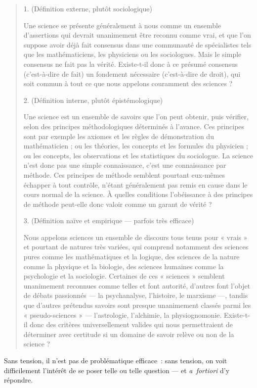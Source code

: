 \documentclass[a4paper,11pt]{article}
\begin{document}
\begin{quote}
  1. (Définition externe, plutôt sociologique)

Une science se présente généralement à nous comme un ensemble
d'assertions qui devrait unanimement être reconnu comme vrai, et que
l'on suppose avoir déjà fait consensus dans une communauté de
spécialistes tels que les mathématiciens, les physiciens ou les
sociologues. Mais le simple consensus ne fait pas la vérité. Existe-t-il
donc à ce présumé consensus (c'est-à-dire de fait) un fondement
nécessaire (c'est-à-dire de droit), qui soit commun à tout ce que nous
appelons couramment des sciences ?


2. (Définition interne, plutôt épistémologique)

Une science est un ensemble de savoirs que l'on peut obtenir, puis
vérifier, selon des principes méthodologiques déterminés à l'avance. Ces
principes sont par exemple les axiomes et les règles de démonstration du
mathématicien ; ou les théories, les concepts et les formules du
physicien ; ou les concepts, les observations et les statistiques du
sociologue. La science n'est donc pas une simple connaissance, c'est une
connaissance par méthode. Ces principes de méthode semblent pourtant
eux-mêmes échapper à tout contrôle, n'étant généralement pas remis en
cause dans le cours normal de la science. À quelles conditions
l'obéissance à des principes de méthode peut-elle donc valoir comme un
garant de vérité ?


3. (Définition naïve et empirique — parfois très efficace)

Nous appelons sciences un ensemble de discours tous tenus pour « vrais »
et pourtant de natures très variées, qui comprend notamment des sciences
pures comme les mathématiques et la logique, des sciences de la nature
comme la physique et la biologie, des sciences humaines comme la
psychologie et la sociologie. Certaines de ces « sciences » semblent
unanimement reconnues comme telles et font autorité, d'autres font
l'objet de débats passionnés — la psychanalyse, l'histoire, le marxisme
—, tandis que d'autres prétendus savoirs sont presque unanimement
classés parmi les « pseudo-sciences » — l'astrologie, l'alchimie, la
physiognomonie. Existe-t-il donc des critères universellement valides
qui nous permettraient de déterminer avec certitude si un domaine de
savoir relève ou non de la science ? 
\end{quote}

Sans tension, il n'est pas de problématique efficace~: sans tension, on
voit difficilement l'intérêt de se poser telle ou telle question --- et
\emph{a~fortiori} d'y répondre. 
\end{document}
